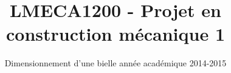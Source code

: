 \documentclass[a4paper,oneside,12pt]{report}
\begin{document}
\begin{titlepage}

\title{LMECA1200 - Projet en construction mécanique 1}
\subtitle{Dimensionnement d’une bielle
année académique 2014-2015}

\end{titlepage}
\end{document}
